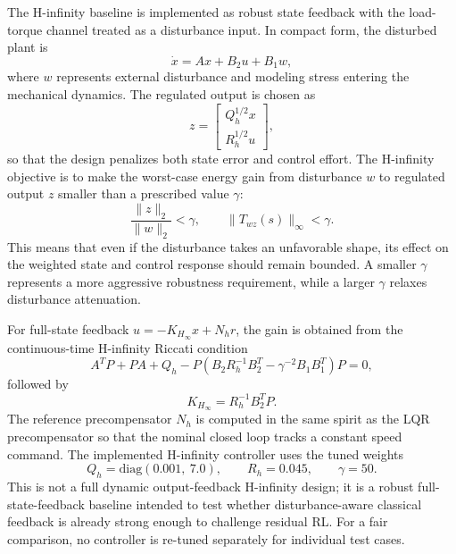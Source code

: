 \documentclass[conference]{IEEEtran}
\begin{document}
The H-infinity baseline is implemented as robust state feedback with the load-torque channel treated as a disturbance input. In compact form, the disturbed plant is
\begin{equation}
\dot{x}=Ax+B_2u+B_1w,
\end{equation}
where $w$ represents external disturbance and modeling stress entering the mechanical dynamics. The regulated output is chosen as
\begin{equation}
z =
\begin{bmatrix}
Q_h^{1/2}x \\
R_h^{1/2}u
\end{bmatrix},
\end{equation}
so that the design penalizes both state error and control effort. The H-infinity objective is to make the worst-case energy gain from disturbance $w$ to regulated output $z$ smaller than a prescribed value $\gamma$:
\begin{equation}
\frac{\|z\|_2}{\|w\|_2} < \gamma,
\qquad
\|T_{wz}(s)\|_{\infty} < \gamma.
\end{equation}
This means that even if the disturbance takes an unfavorable shape, its effect on the weighted state and control response should remain bounded. A smaller $\gamma$ represents a more aggressive robustness requirement, while a larger $\gamma$ relaxes disturbance attenuation.

For full-state feedback $u=-K_{H_\infty}x+N_h r$, the gain is obtained from the continuous-time H-infinity Riccati condition
\begin{equation}
A^T P + PA + Q_h
-P\left(B_2R_h^{-1}B_2^T-\gamma^{-2}B_1B_1^T\right)P = 0,
\end{equation}
followed by
\begin{equation}
K_{H_\infty}=R_h^{-1}B_2^T P.
\end{equation}
The reference precompensator $N_h$ is computed in the same spirit as the LQR precompensator so that the nominal closed loop tracks a constant speed command. The implemented H-infinity controller uses the tuned weights
\begin{equation}
Q_h=\mathrm{diag}(0.001,\ 7.0),
\qquad
R_h=0.045,
\qquad
\gamma=50.
\end{equation}
This is not a full dynamic output-feedback H-infinity design; it is a robust full-state-feedback baseline intended to test whether disturbance-aware classical feedback is already strong enough to challenge residual RL. For a fair comparison, no controller is re-tuned separately for individual test cases.
\end{document}
